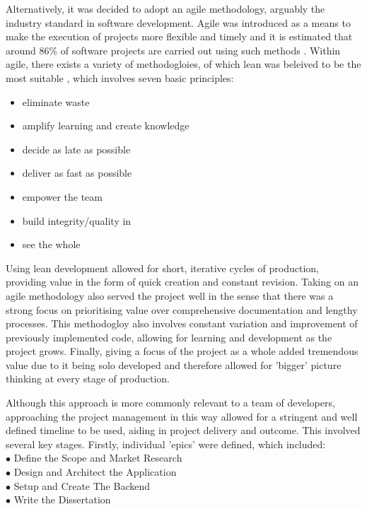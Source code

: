 \documentclass[12pt]{article}
\begin{document}
	Alternatively, it was decided to adopt an agile methodology, arguably the industry standard in software development. Agile was introduced as a means to make the execution of projects more flexible and timely and it is estimated that around 86\% of software projects are carried out using such methods \cite{StateAgileReport2021}.
	Within agile, there exists a variety of methodogloies, of which lean was beleived to be the most suitable \cite{poppendieckLeanSoftwareDevelopment2003}, which involves seven basic principles:
	\begin{itemize}
		\item eliminate waste
		\item amplify learning and create knowledge
		\item decide as late as possible
		\item deliver as fast as possible
		\item empower the team
		\item build integrity/quality in
		\item see the whole
	\end{itemize}
	
	
	
	Using lean development allowed for short, iterative cycles of production, providing value in the form of quick creation and constant revision. Taking on an agile methodology also served the project well in the sense that there was a strong focus on prioritising value over comprehensive documentation and lengthy processes. This methodogloy also involves constant variation and improvement of previously implemented code, allowing for learning and development as the project grows. Finally, giving a focus of the project as a whole added tremendous value due to it being solo developed and therefore allowed for 'bigger' picture thinking at every stage of production.
	

	Although this approach is more commonly relevant to a team of developers, approaching the project management in this way allowed for a stringent and well defined timeline to be used, aiding in project delivery and outcome. This involved several key stages.
	Firstly, individual 'epics' were defined, which included:
	\\
	$\bullet$ Define the Scope and Market Research
	\\
	$\bullet$ Design and Architect the Application
	\\
	$\bullet$ Setup and Create The Backend
	\\
	$\bullet$ Write the Dissertation
	\\
	
\end{document}
